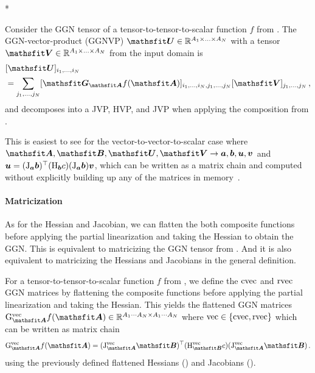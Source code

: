 \switchcolumn[1]*
\switchcolumn[0]

\begin{definition}\label{def:ggnvp}%
  Consider the GGN tensor of a tensor-to-tensor-to-scalar function $f$ from .
  The GGN-vector-product (GGNVP) $\tU \in \sR^{A_1 \times \ldots \times A_N}$ with a tensor $\tV \in \sR^{A_1 \times \ldots \times A_N}$ from the input domain is
  \begin{align*}
    &[\tU]_{i_1, \dots, i_N}
    \\
    &=
      \sum_{j_1, \dots, j_N}
      [\tG_{\tA} f(\tA)]_{i_1, \dots, i_N, j_1, \dots, j_N}
      [\tV]_{j_1, \dots, j_N}\,,
  \end{align*}
  and decomposes into a JVP, HVP, and JVP when applying the composition from .
\end{definition}
This is easiest to see for the vector-to-vector-to-scalar case where $\tA, \tB, \tU, \tV \to \va, \vb, \vu, \vv$ and ${\bm{u}} = (\mathrm{J}_{{\bm{a}}}{\bm{b}})^{\top} (\mathrm{H}_{{\bm{b}}} c) (\mathrm{J}_{{\bm{a}}} {\bm{b}}) {\bm{v}}$, which can be written as a matrix chain and computed without explicitly building up any of the matrices in memory~\cite{schraudolph2002fast}.

\paragraph{Matricization} As for the Hessian and Jacobian, we can flatten the both composite functions before applying the partial linearization and taking the Hessian to obtain the GGN.
This is equivalent to matricizing the GGN tensor from .
And it is also equivalent to matricizing the Hessians and Jacobians in the general definition.

\begin{definition}\label{def:vec_ggns}
  For a tensor-to-tensor-to-scalar function $f$ from , we define the $\operatorname{cvec}$ and $\operatorname{rvec}$ GGN matrices by flattening the composite functions before applying the partial linearization and taking the Hessian. This yields the flattened GGN matrices $\ggn^{\vec}_{\tA}f(\tA) \in \sR^{A_1 \cdots A_N \times A_1 \cdots A_N}$ where $\operatorname{vec} \in \{\operatorname{cvec}, \operatorname{rvec}\}$ which can be written as matrix chain
  \begin{align*}
    \ggn^{\vec}_{\tA} f(\tA)
    =
    (\jac^{\vec}_{\tA} \tB)^{\top}
    (\hess^{\vec}_{\tB} c)
    (\jac^{\vec}_{\tA} \tB)\,.
  \end{align*}
  using the previously defined flattened Hessians () and Jacobians ().
\end{definition}

